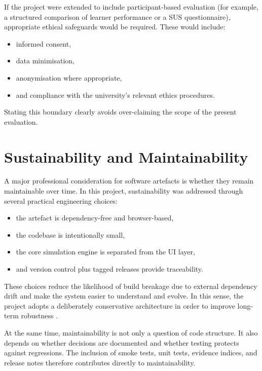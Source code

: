 If the project were extended to include participant-based evaluation (for example, a structured comparison of learner performance or a SUS questionnaire), appropriate ethical safeguards would be required. These would include:
\begin{itemize}
  \item informed consent,
  \item data minimisation,
  \item anonymisation where appropriate,
  \item and compliance with the university’s relevant ethics procedures.
\end{itemize}

Stating this boundary clearly avoids over-claiming the scope of the present evaluation.

\section{Sustainability and Maintainability}
A major professional consideration for software artefacts is whether they remain maintainable over time. In this project, sustainability was addressed through several practical engineering choices:
\begin{itemize}
  \item the artefact is dependency-free and browser-based,
  \item the codebase is intentionally small,
  \item the core simulation engine is separated from the UI layer,
  \item and version control plus tagged releases provide traceability.
\end{itemize}

These choices reduce the likelihood of build breakage due to external dependency drift and make the system easier to understand and evolve. In this sense, the project adopts a deliberately conservative architecture in order to improve long-term robustness \cite{chacon2014progit,wilson2014best}.

At the same time, maintainability is not only a question of code structure. It also depends on whether decisions are documented and whether testing protects against regressions. The inclusion of smoke tests, unit tests, evidence indices, and release notes therefore contributes directly to maintainability.

